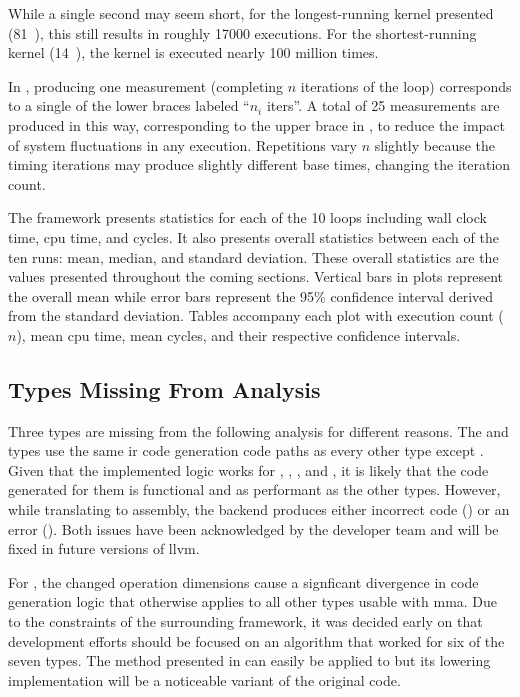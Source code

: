\documentclass[\main/thesis.tex]{subfiles}
\begin{document}
While a single second may seem short, for the longest-running kernel presented (\atilde\SI{81}{\textit{\micro\second}}), this still results in roughly 17000 executions.
For the shortest-running kernel (\atilde\SI{14}{\textit{\nano\second}}), the kernel is executed nearly 100 million times.

In , producing one measurement (\ie completing $n$ iterations of the loop) corresponds to a single of the lower braces labeled ``$n_i$ iters''.
A total of 25 measurements are produced in this way, corresponding to the upper brace in , to reduce the impact of system fluctuations in any execution.
Repetitions vary $n$ slightly because the timing iterations may produce slightly different base times, changing the iteration count.

The framework presents statistics for each of the 10 loops including wall clock time, \gls{cpu} time, and cycles.
It also presents overall statistics between each of the ten runs: mean, median, and standard deviation.
These overall statistics are the values presented throughout the coming sections.
Vertical bars in plots represent the overall mean while error bars represent the 95\% confidence interval derived from the standard deviation.
Tables accompany each plot with execution count ($n$), mean \gls{cpu} time, mean cycles, and their respective confidence intervals.

\subsection{Types Missing From Analysis}
Three types are missing from the following analysis for different reasons.
The  and  types use the same \gls{ir} code generation code paths as every other type except .
Given that the implemented logic works for , , , and , it is likely that the code generated for them is functional and as performant as the other types.
However, while translating to assembly, the backend produces either incorrect code () or an error ().
Both issues have been acknowledged by the developer team and will be fixed in future versions of \gls{llvm}.

For , the changed operation dimensions cause a signficant divergence in code generation logic that otherwise applies to all other types usable with \gls{mma}.
Due to the constraints of the surrounding framework, it was decided early on that development efforts should be focused on an algorithm that worked for six of the seven types.
The method presented in  can easily be applied to  but its \gls{lowering} implementation will be a noticeable variant of the original code.
\end{document}
